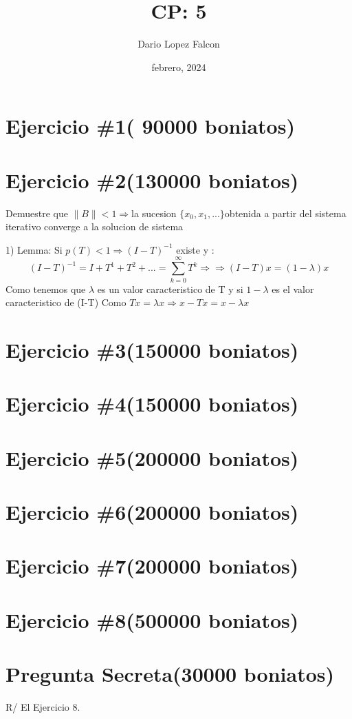 \documentclass[a4paper,12pt]{article}
\begin{document}
\title{CP: 5}
\author{Dario Lopez Falcon}
\date{febrero, 2024}
\maketitle

\section*{Ejercicio \#1( 90000 boniatos)}



\section*{Ejercicio \#2(130000 boniatos)}

Demuestre que $ \|B\|<1\Rightarrow $la sucesion $\{x_0,x_1,...\} $obtenida a partir del sistema iterativo converge a la solucion de sistema 

1) Lemma: Si $p(T)<1\Rightarrow (I-T)^{-1}$ existe y :
\[(I-T)^{-1}=I+T^1+T^2+...=\sum_{k=0}^{\infty}T^k \Rightarrow \Rightarrow (I-T)x=(1-\lambda)x\]
Como tenemos que $\lambda$ es un valor caracteristico de T y si $1-\lambda$ es el valor caracteristico de (I-T) 
    Como $Tx=\lambda x \Rightarrow x-Tx=x-\lambda x$
\section*{Ejercicio \#3(150000 boniatos)}

\section*{Ejercicio \#4(150000 boniatos)}

\section*{Ejercicio \#5(200000 boniatos)}

\section*{Ejercicio \#6(200000 boniatos)}

\section*{Ejercicio \#7(200000 boniatos)}

\section*{Ejercicio \#8(500000 boniatos)}

\section*{Pregunta Secreta(30000 boniatos)}

R/ El Ejercicio 8.


\end{document}
